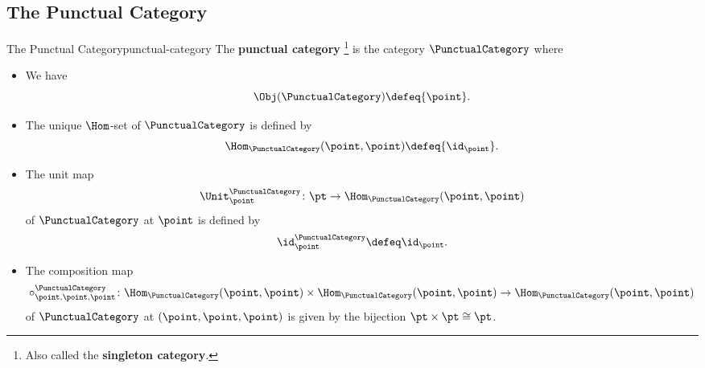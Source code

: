 \subsection{The Punctual Category}\label{subsection-the-punctual-category}
\begin{example}{The Punctual Category}{punctual-category}%
    The \textbf{punctual category}%
    \footnote{%
        Also called the \textbf{singleton category}.
        \par\vspace*{\TCBBoxCorrection}
    } %
    is the category $\PunctualCategory$ where
    \begin{itemize}
        \item{}We have
            \[
                \Obj(\PunctualCategory)
                \defeq
                \{\point\}.
            \]
        \item{}The unique $\Hom$-set of $\PunctualCategory$ is defined by
            \[
                \Hom_{\PunctualCategory}(\point,\point)
                \defeq
                \{\id_{\point}\}.
            \]%
        \item{}The unit map
            \[
                \Unit^{\PunctualCategory}_{\point}
                \colon
                \pt
                \to
                \Hom_{\PunctualCategory}(\point,\point)
            \]%
            of $\PunctualCategory$ at $\point$ is defined by
            \[
                \id^{\PunctualCategory}_{\point}
                \defeq
                \id_{\point}.
            \]%
        \item{}The composition map
            \[
                \circ^{\PunctualCategory}_{\point,\point,\point}
                \colon
                \Hom_{\PunctualCategory}(\point,\point)
                \times
                \Hom_{\PunctualCategory}(\point,\point)
                \to
                \Hom_{\PunctualCategory}(\point,\point)
            \]%
            of $\PunctualCategory$ at $(\point,\point,\point)$ is given by the bijection $\pt\times\pt\cong\pt$.
    \end{itemize}
\end{example}
